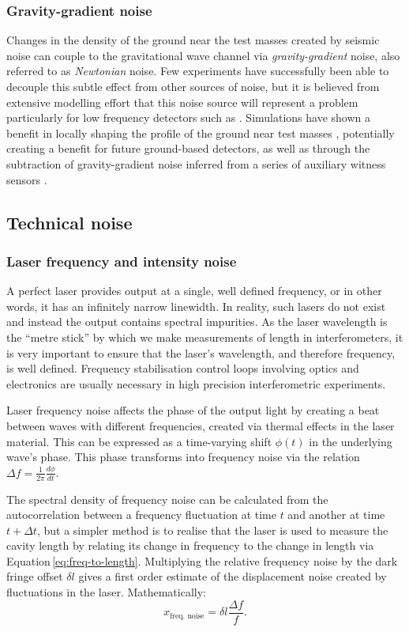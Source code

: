 \subsubsection{Gravity-gradient noise}
Changes in the density of the ground near the test masses created by seismic noise can couple to the gravitational wave channel via \emph{gravity-gradient} noise, also referred to as \emph{Newtonian} noise. Few experiments have successfully been able to decouple this subtle effect from other sources of noise, but it is believed from extensive modelling effort that this noise source will represent a problem particularly for low frequency detectors such as \ETLF{} \cite{ET2011, Hild2011}. Simulations have shown a benefit in locally shaping the profile of the ground near test masses \cite{Harms2014}, potentially creating a benefit for future ground-based detectors, as well as through the subtraction of gravity-gradient noise inferred from a series of auxiliary witness sensors \cite{Harms2015}.

\subsection{Technical noise}

\subsubsection{Laser frequency and intensity noise}
A perfect laser provides output at a single, well defined frequency, or in other words, it has an infinitely narrow linewidth. In reality, such lasers do not exist and instead the output contains spectral impurities. As the laser wavelength is the ``metre stick'' by which we make measurements of length in interferometers, it is very important to ensure that the laser's wavelength, and therefore frequency, is well defined. Frequency stabilisation control loops involving optics and electronics are usually necessary in high precision interferometric experiments.

Laser frequency noise affects the phase of the output light by creating a beat between waves with different frequencies, created via thermal effects in the laser material. This can be expressed as a time-varying shift $\phi \left( t \right)$ in the underlying wave's phase. This phase transforms into frequency noise via the relation $\Delta f = \frac{1}{2 \pi} \frac{d \phi}{dt}$.

The spectral density of frequency noise can be calculated from the autocorrelation between a frequency fluctuation at time $t$ and another at time $t + \Delta t$, but a simpler method is to realise that the laser is used to measure the cavity length by relating its change in frequency to the change in length via Equation\,\ref{eq:freq-to-length}. Multiplying the relative frequency noise by the dark fringe offset $\delta l$  gives a first order estimate of the displacement noise created by fluctuations in the laser. Mathematically:
\begin{equation}
  \label{eq:laser-freq-noise}
  x_{\text{freq. noise}} = \delta l \frac{\Delta f}{f}.
\end{equation}

